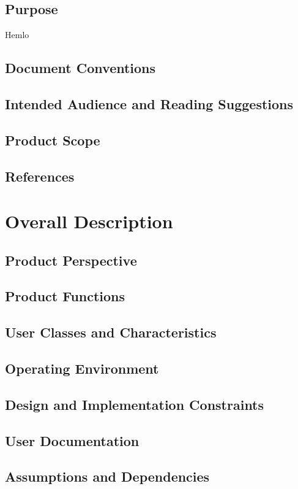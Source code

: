 \documentclass[letterpaper,12pt]{article}
\begin{document}
\subsection{\Large Purpose}
    Hemlo
\subsection{\Large Document Conventions}
\subsection{\Large Intended Audience and Reading Suggestions}
\subsection{\Large Product Scope}
\subsection{\Large References}

\section{\LARGE Overall Description}
\subsection{\Large Product Perspective}
\subsection{\Large Product Functions}
\subsection{\Large User Classes and Characteristics}
\subsection{\Large Operating Environment}
\subsection{\Large Design and Implementation Constraints}
\subsection{\Large User Documentation}
\subsection{\Large Assumptions and Dependencies}
\end{document}
